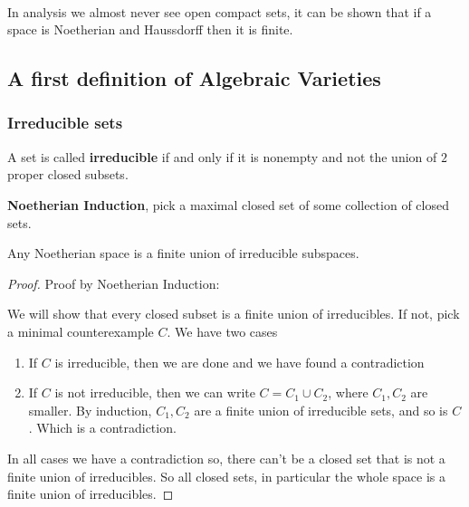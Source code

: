 \

\begin{remark}
    In analysis we almost never see open compact sets, it can be shown that if a space is Noetherian and Haussdorff then it is finite.
\end{remark}

\subsection{A first definition of Algebraic Varieties}

\subsubsection{Irreducible sets}

\begin{definition}
    A set is called \textbf{irreducible} if and only if it is nonempty and not the union of $2$ proper closed subsets.
\end{definition}

\begin{definition}
    \textbf{Noetherian Induction}, pick a maximal closed set of some collection of closed sets.
\end{definition}

\begin{theorem}
    Any Noetherian space is a finite union of irreducible subspaces.

    \begin{proof}
        Proof by Noetherian Induction:

        We will show that every closed subset is a finite union of irreducibles. If not, pick a minimal counterexample $C$. We have two cases\begin{enumerate}
            \item If $C$ is irreducible, then we are done and we have found a contradiction
            \item If $C$ is not irreducible, then we can write $C=C_1\cup C_2$, where $C_1,C_2$ are smaller. By induction, $C_1,C_2$ are a finite union of irreducible sets, and so is $C$. Which is a contradiction.
        \end{enumerate}

        In all cases we have a contradiction so, there can't be a closed set that is not a finite union of irreducibles. So all closed sets, in particular the whole space is a finite union of irreducibles.
    \end{proof}
\end{theorem}

